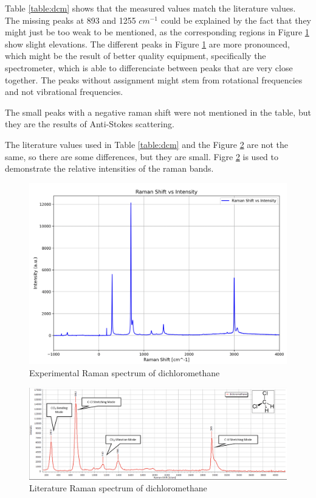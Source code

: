     Table \ref{table:dcm} shows that the measured values match the literature values. The missing peaks at 893 and 1255 \( cm^{-1}\) could be explained by the fact that they might just be too weak to be mentioned, as the corresponding regions in Figure \ref{fig:dcm_x} show slight elevations. The different peaks in Figure \ref{fig:dcm_x} are more pronounced, which might be the result of better quality equipment, specifically the spectrometer, which is able to differenciate between peaks that are very close together. The peaks without assignment might stem from rotational frequencies and not vibrational frequencies.


    \bigskip

    The small peaks with a negative raman shift were not mentioned in the table, but they are the results of Anti-Stokes scattering.

    \bigskip

    The literature values used in Table \ref{table:dcm} and the Figure \ref{fig:dcm_l} are not the same, so there are some differences, but they are small. Figre \ref{fig:dcm_l} is used to demonstrate the relative intensities of the raman bands.

    \newpage
     
    \begin{figure}[h]
        \centering
        \includegraphics[width=\textwidth]{images/raman_spectra/raman_shift_DCM.png}
        \caption{Experimental Raman spectrum of dichloromethane}
        \label{fig:dcm_x}
    \end{figure}

    \begin{figure}[h]
        \includegraphics[width=\textwidth]{images/lit_raman/dichloromethane.png}
        \caption{Literature Raman spectrum of dichloromethane \cite{spectrumdcm}}
        \label{fig:dcm_l}
    \end{figure}

